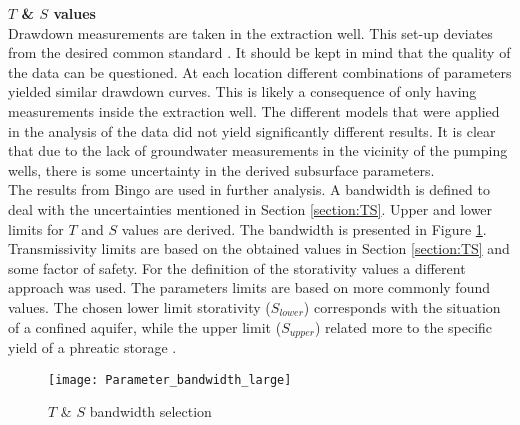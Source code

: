 \textbf{$T$ \& $S$ values} \\
Drawdown measurements are taken in the extraction well. This set-up deviates from the desired common standard \citep{Kruseman2000}. It should be kept in mind that the quality of the data can be questioned. At each location different combinations of parameters yielded similar drawdown curves. This is likely a consequence of only having measurements inside the extraction well. The different models that were applied in the analysis of the data did not yield significantly different results. It is clear that due to the lack of groundwater measurements in the vicinity of the pumping wells, there is some uncertainty in the derived subsurface parameters. \\

The results from Bingo are used in further analysis. A bandwidth is defined to deal with the uncertainties mentioned in Section \ref{section:TS}. Upper and lower limits for $T$ and $S$ values are derived. The bandwidth is presented in Figure \ref{fig:Parameter_bandwidth}. Transmissivity limits are based on the obtained values in Section \ref{section:TS} and some factor of safety. For the definition of the storativity values a different approach was used. The  parameters limits are based on more commonly found  values. The chosen lower limit storativity ($S_{lower}$) corresponds with the situation of a confined aquifer, while the upper limit ($S_{upper}$) related more to the specific yield of a phreatic storage \citep{Strack1989,Fitts2012}. \\

\begin{figure}[h!]
 \centering
 \texttt{[image: Parameter\_bandwidth\_large]}
 \captionsetup{justification=centering} 
 \caption{$T$ \& $S$ bandwidth selection}
 \label{fig:Parameter_bandwidth}
\end{figure}


